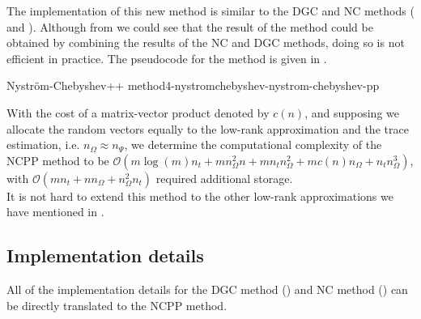 The implementation of this new method is similar to the \gls{DGC} and \gls{NC} methods ( and ).
Although from  we
could see that the result of the  method could be obtained by
combining the results of the \gls{NC} and \gls{DGC} methods, doing so is not
efficient in practice. The pseudocode for the  method is given
in .

\begin{algo}{Nystr\"om-Chebyshev++ method}{4-nystromchebyshev-nystrom-chebyshev-pp}
    
\end{algo}

With the cost of a matrix-vector product denoted by
$c(n)$, and supposing we allocate the random vectors equally
to the low-rank approximation and the trace estimation, i.e. $n_{\Omega} \approx n_{\Psi}$,
we determine the computational complexity of the \gls{NCPP}
method to be $\mathcal{O}(m \log(m) n_t + m n_{\Omega}^2 n + m n_t n_{\Omega}^2 +  m c(n) n_{\Omega} + n_t n_{\Omega}^3)$, with
$\mathcal{O}(m n_t + n n_{\Omega} + n_{\Omega}^2 n_t)$ required additional storage.\\

It is not hard to extend this method to the other low-rank approximations
we have mentioned in .


\subsection{Implementation details}
\label{subsec:4-nystromchebyshev-implementation-details}

All of the implementation details for the \gls{DGC} method ()
and \gls{NC} method ()
can be directly translated to the \gls{NCPP} method.\\

